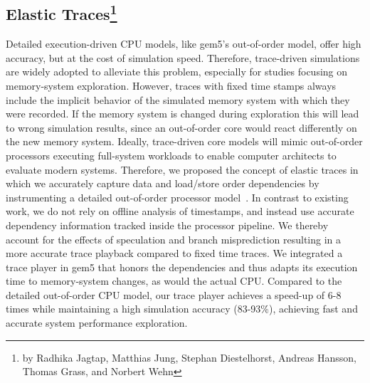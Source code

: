 \subsection[Elastic Traces]{Elastic Traces\footnote{by Radhika Jagtap, Matthias Jung, Stephan Diestelhorst, Andreas Hansson, Thomas Grass, and Norbert Wehn}}
\label{sec:elastic}

Detailed execution-driven CPU models, like gem5's out-of-order model, offer high accuracy, but at the cost of simulation speed.
Therefore, trace-driven simulations are widely adopted to alleviate this problem, especially for studies focusing on memory-system exploration.
However, traces with fixed time stamps always include the implicit behavior of the simulated memory system with which they were recorded.
If the memory system is changed during exploration this will lead to wrong simulation results, since an out-of-order core would react differently on the new memory system.
Ideally, trace-driven core models will mimic out-of-order processors executing full-system workloads to enable computer architects to evaluate modern systems.
Therefore, we proposed the concept of elastic traces in which we accurately capture data and load/store order dependencies by instrumenting a detailed out-of-order processor model~\cite{jagdie_16}.
In contrast to existing work, we do not rely on offline analysis of timestamps, and instead use accurate dependency information tracked inside the processor pipeline.
We thereby account for the effects of speculation and branch misprediction resulting in a more accurate trace playback compared to fixed time traces.
We integrated a trace player in gem5 that honors the dependencies and thus adapts its execution time to memory-system changes, as would the actual CPU. Compared to the detailed out-of-order CPU model, our trace player achieves a speed-up of 6-8 times while maintaining a high simulation accuracy (83-93\%), achieving fast and accurate system performance exploration.
